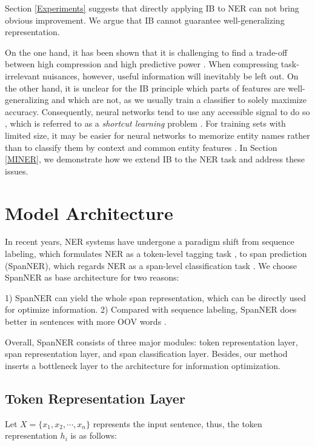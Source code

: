 \documentclass[11pt]{article}
\begin{document}
Section \ref{Experiments} suggests that directly applying IB to NER can not bring obvious improvement. We argue that IB  cannot guarantee well-generalizing representation.

On the one hand, it has been shown that it is challenging to find a trade-off between high compression and high predictive power \cite{tishby2000information,wang2019deep,piran2020dual}. When compressing task-irrelevant nuisances, however, useful information will inevitably be left out. On the other hand, it is unclear for the IB principle which parts of features are well-generalizing and which are not, as we usually train a classifier to solely maximize accuracy. Consequently, neural networks tend to use any accessible signal to do so \cite{ilyas2019adversarial}, which is referred to as a \textit{shortcut learning} problem \cite{geirhos2020shortcut}. For training sets with limited size, it may be easier for neural networks to memorize entity names rather than to classify them by context and common entity features \cite{agarwal2021interpretability}. In Section \ref{MINER}, we demonstrate how we extend IB to the NER task and address these issues.


\section{Model Architecture}
In recent years, NER systems have undergone a paradigm shift from sequence labeling, which formulates NER as a token-level tagging task \cite{chiu2016named,akbik2018contextual,yan2019tener}, to span prediction (SpanNER), which regards NER as a span-level classification task \cite{mengge-etal-2020-coarse,yamada-etal-2020-luke,fu-etal-2021-spanner}. We choose SpanNER as base architecture for two reasons:

1) SpanNER can yield the whole span representation, which can be directly used for optimize information. 
2) Compared with sequence labeling, SpanNER does better in sentences with more OOV words \cite{fu-etal-2021-spanner}. 

Overall, SpanNER consists of three major modules: token representation layer, span representation layer, and span classification layer. Besides, our method inserts a bottleneck layer to the architecture for information optimization. 

\subsection{Token Representation Layer}
Let $X=\{x_1, x_2, \cdots, x_n\}$ represents the input sentence, thus, the token representation $h_i$ is as follows:
\end{document}
